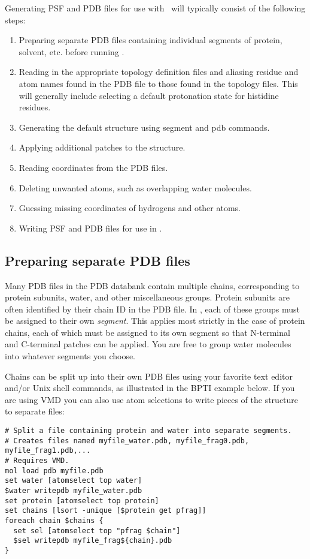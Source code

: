 Generating PSF and PDB files for use with \NAMD\ will typically consist of
the following steps:

\begin{enumerate}
\item Preparing separate PDB files containing individual segments of
protein, solvent, etc. before running \PSFGEN.
\item Reading in the appropriate topology definition files and aliasing
residue and atom names found in the PDB file to those found in the topology
files.  This will generally include selecting a default protonation state
for histidine residues.
\item Generating the default structure using segment and pdb commands.
\item Applying additional patches to the structure.
\item Reading coordinates from the PDB files.
\item Deleting unwanted atoms, such as overlapping water molecules.
\item Guessing missing coordinates of hydrogens and other atoms.
\item Writing PSF and PDB files for use in \NAMD.
\end{enumerate}

\subsection{Preparing separate PDB files}
Many PDB files in the PDB databank contain multiple chains, corresponding
to protein subunits, water, and other miscellaneous groups.  Protein subunits
are often identified by their chain ID in the PDB file.  In \PSFGEN, each of
these groups must be assigned to their own {\em segment}.  This applies most
strictly in the case of protein chains, each of which must be assigned to
its own segment so that N-terminal and C-terminal patches can be applied.
You are free to group water molecules into whatever segments you choose.

Chains can be split up into their own PDB files using your favorite text
editor and/or Unix shell commands, as illustrated in the BPTI example below.
If you are using VMD you can also use atom selections to write pieces of
the structure to separate files:

\begin{verbatim}
# Split a file containing protein and water into separate segments.
# Creates files named myfile_water.pdb, myfile_frag0.pdb, myfile_frag1.pdb,...
# Requires VMD.
mol load pdb myfile.pdb
set water [atomselect top water]
$water writepdb myfile_water.pdb
set protein [atomselect top protein]
set chains [lsort -unique [$protein get pfrag]]
foreach chain $chains {
  set sel [atomselect top "pfrag $chain"]
  $sel writepdb myfile_frag${chain}.pdb
}
\end{verbatim}

